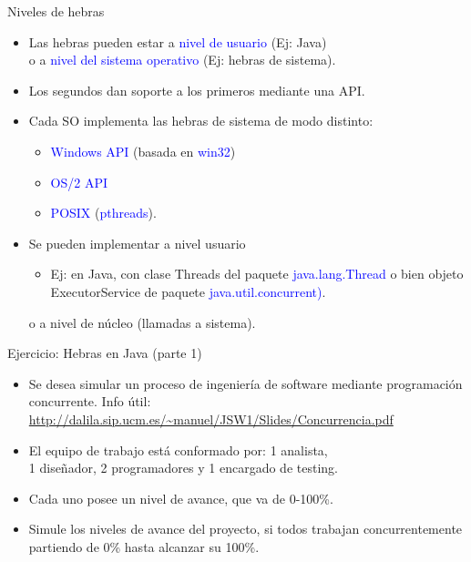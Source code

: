 \documentclass[handout]{beamer} %
\newcommand{\blue}[1]{\textcolor{blue}{#1}}
\begin{document}
\begin{frame}{Niveles de hebras}
    \begin{itemize}
        \item Las hebras pueden estar a \blue{nivel de usuario} (Ej: Java)\\o a \blue{nivel del sistema operativo} (Ej: hebras de sistema).
        \item Los segundos dan soporte a los primeros mediante una API.
        \item Cada SO implementa las hebras de sistema de modo distinto:
        \begin{itemize}
            \item \blue{Windows API} (basada en \blue{win32})
            \item \blue{OS/2 API}
            \item \blue{POSIX} (\blue{pthreads}).
        \end{itemize}
        \item Se pueden implementar a nivel usuario
        \begin{itemize}
            \item Ej: en Java, con clase Threads del paquete \blue{java.lang.Thread} o bien objeto ExecutorService de paquete \blue{java.util.concurrent)}.
        \end{itemize} o a nivel de núcleo (llamadas a sistema).
    \end{itemize}
\end{frame}

\begin{frame}{Ejercicio: Hebras en Java (parte 1)}
    \begin{itemize}
        \item Se desea simular un proceso de ingeniería de software mediante programación concurrente. {\scriptsize Info útil:\\ \blue{\url{http://dalila.sip.ucm.es/~manuel/JSW1/Slides/Concurrencia.pdf}}}
        \item El equipo de trabajo está conformado por: 1 analista,\\1 diseñador, 2 programadores y 1 encargado de testing.
        \item Cada uno posee un nivel de avance, que va de 0-100\%.
        \item Simule los niveles de avance del proyecto, si todos trabajan concurrentemente partiendo de 0\% hasta alcanzar su 100\%.
    \end{itemize}
\end{frame}
\end{document}
